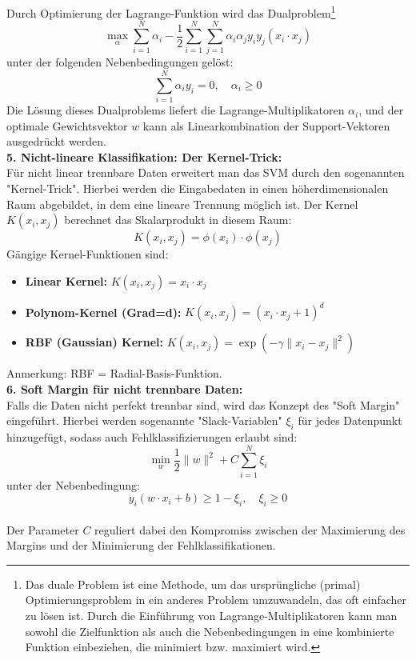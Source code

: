 \documentclass[12pt]{article}
\begin{document}
%
Durch Optimierung der Lagrange-Funktion wird das Dualproblem\footnote{Das duale Problem ist eine Methode, um das ursprüngliche (primal) Optimierungsproblem in ein anderes Problem umzuwandeln, das oft einfacher zu lösen ist. Durch die Einführung von Lagrange-Multiplikatoren kann man sowohl die Zielfunktion als auch die Nebenbedingungen in eine kombinierte Funktion einbeziehen, die minimiert bzw. maximiert wird.}
\[
\max_{\alpha} \sum_{i=1}^N \alpha_i - \frac{1}{2} \sum_{i=1}^N \sum_{j=1}^N \alpha_i \alpha_j y_i y_j (x_i \cdot x_j)
\]
unter der folgenden Nebenbedingungen gelöst:
\[
\sum_{i=1}^N \alpha_i y_i = 0, \quad \alpha_i \geq 0
\]
%
Die Lösung dieses Dualproblems liefert die Lagrange-Multiplikatoren \(\alpha_i\), und der optimale Gewichtsvektor \(w\) kann als Linearkombination der Support-Vektoren ausgedrückt werden.\\[0.2cm]
%
\textbf{5. Nicht-lineare Klassifikation: Der Kernel-Trick:}\\
Für nicht linear trennbare Daten erweitert man das SVM durch den sogenannten "Kernel-Trick".  Hierbei werden die Eingabedaten in einen höherdimensionalen Raum abgebildet, in dem eine lineare Trennung möglich ist. Der Kernel \(K(x_i, x_j)\) berechnet das Skalarprodukt in diesem Raum:
\[
K(x_i, x_j) = \phi(x_i) \cdot \phi(x_j)
\]
%
Gängige Kernel-Funktionen sind:
\begin{itemize}
    \item \textbf{Linear Kernel:} \( K(x_i, x_j) = x_i \cdot x_j \)
    \item \textbf{Polynom-Kernel (Grad=d):} \( K(x_i, x_j) = (x_i \cdot x_j + 1)^d \)
    \item \textbf{RBF (Gaussian) Kernel:} \( K(x_i, x_j) = \exp(-\gamma \|x_i - x_j\|^2) \)
\end{itemize}
%
Anmerkung: RBF = Radial-Basis-Funktion.\\[0.3cm]
%
\textbf{6. Soft Margin für nicht trennbare Daten:}\\
Falls die Daten nicht perfekt trennbar sind, wird das Konzept des "Soft Margin" eingeführt. Hierbei werden sogenannte "Slack-Variablen" \(\xi_i\) für jedes Datenpunkt hinzugefügt, sodass auch Fehlklassifizierungen erlaubt sind:\\
\[
\min_w \frac{1}{2} \|w\|^2 + C \sum_{i=1}^N \xi_i
\]
unter der Nebenbedingung:
\[
y_i (w \cdot x_i + b) \geq 1 - \xi_i, \quad \xi_i \geq 0
\]\\
%
Der Parameter \(C\) reguliert dabei den Kompromiss zwischen der Maximierung des Margins und der Minimierung der Fehlklassifikationen.\\[0.3cm]
\end{document}
